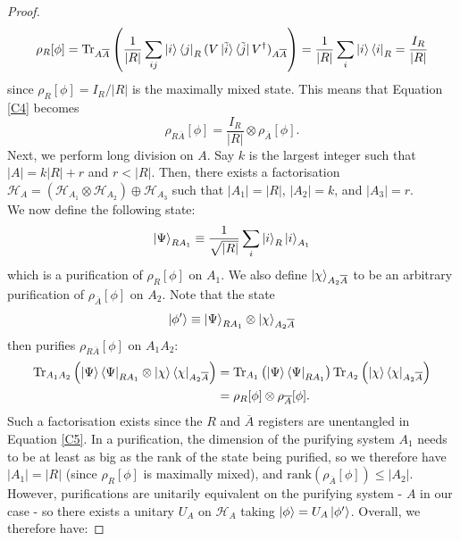 \documentclass[12pt,a4paper]{report}
\numberwithin{equation}{section}
\newcommand{\ketbra}[2]{\ket{#1}\bra{#2}}
\newcommand{\ketbras}[1]{\ketbra{#1}{#1}}
\newcommand{\ol}[1]{\overline{#1}}
\theoremstyle{definition}
\theoremstyle{theorem}
\theoremstyle{theorem}
\theoremstyle{example}
\theoremstyle{definition}
\begin{document}
\begin{proof}
\begin{equation}
		\rho_{R}[\phi]=\text{Tr}_{A\overline{A}}\left(\frac{1}{|R|}\sum_{ij}\ketbra{i}{j}_{R}(V\ketbra{\tilde{i}}{\tilde{j}}V^{\dagger})_{A\overline{A}}\right)=\frac{1}{|R|}\sum_{i}\ketbras{i}_{R}=\frac{I_{R}}{|R|}
	\end{equation}
	since $\rho_{R}[\phi]=I_{R}/|R|$ is the maximally mixed state. This means that Equation \ref{C4} becomes
	\begin{equation}\label{C5}
		\rho_{R\overline{A}}[\phi]=\frac{I_{R}}{|R|}\otimes\rho_{\overline{A}}[\phi].
	\end{equation}
	Next, we perform long division on $A$. Say $k$ is the largest integer such that $|A|=k|R|+r$ and $r<|R|$. Then, there exists a factorisation $\mathcal{H}_{A}=\left(\mathcal{H}_{A_{1}}\otimes\mathcal{H}_{A_{2}}\right)\oplus\mathcal{H}_{A_{3}}$ such that $|A_{1}|=|R|$, $|A_{2}|=k$, and $|A_{3}|=r$.\\
	We now define the following state:
	\begin{equation}
		\ket{\Psi}_{RA_{1}}\equiv\frac{1}{\sqrt{|R|}}\sum_{i}\ket{i}_{R}\ket{i}_{A_{1}}
	\end{equation}
	which is a purification of $\rho_{R}[\phi]$ on $A_{1}$. We also define $\ket{\chi}_{A_{2}\ol{A}}$ to be an arbitrary purification of $\rho_{\ol{A}}[\phi]$ on $A_{2}$. Note that the state
	\begin{equation}
		\ket{\phi'}\equiv\ket{\Psi}_{RA_{1}}\otimes\ket{\chi}_{A_{2}\overline{A}}
	\end{equation}
	then purifies $\rho_{R\overline{A}}[\phi]$ on $A_{1}A_{2}$:
	\begin{equation}
		\begin{aligned}
			\text{Tr}_{A_{1}A_{2}}\left(\ketbras{\Psi}_{RA_{1}}\otimes\ketbras{\chi}_{A_{2}\overline{A}}\right)&=\text{Tr}_{A_{1}}\left(\ketbras{\Psi}_{RA_{1}}\right)\text{Tr}_{A_{2}}\left(\ketbras{\chi}_{A_{2}\overline{A}}\right)\\&=\rho_{R}[\phi]\otimes\rho_{\overline{A}}[\phi].
		\end{aligned}
	\end{equation}
	Such a factorisation exists since the $R$ and $\ol{A}$ registers are unentangled in Equation \ref{C5}. In a purification, the dimension of the purifying system $A_{1}$ needs to be at least as big as the rank of the state being purified, so we therefore have $|A_{1}|=|R|$ (since $\rho_{R}[\phi]$ is maximally mixed), and $\text{rank}\left(\rho_{\overline{A}}[\phi]\right)\leq|A_{2}|$.\\
	However, purifications are unitarily equivalent on the purifying system - $A$ in our case - so there exists a unitary $U_{A}$ on $\mathcal{H}_{A}$ taking $\ket{\phi}=U_{A}\ket{\phi'}$. Overall, we therefore have:

\end{proof}
\end{document}
